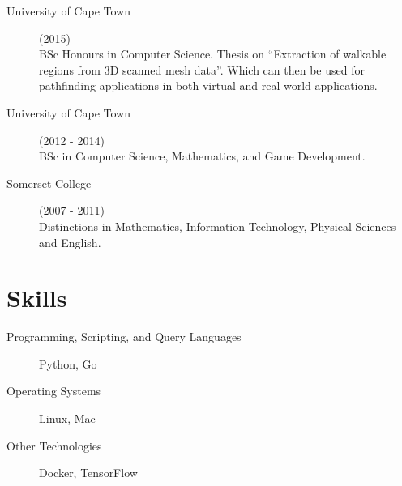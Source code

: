 \documentclass[margin,line,a4paper]{resume}
\begin{document}
\begin{resume}
\begin{description}
                \item[University of Cape Town] (2015) \\
                    BSc Honours in Computer Science. Thesis on ``Extraction of  walkable regions from 3D scanned mesh data''.
                    Which can then be used for pathfinding applications in both virtual and real world applications.

                \item[University of Cape Town] (2012 - 2014) \\
                    BSc in Computer Science, Mathematics, and Game Development.

                \item[Somerset College](2007 - 2011)\\
                    Distinctions in Mathematics, Information Technology, Physical Sciences and English.
            \end{description}

        \section{\mysidestyle Skills}
        	\begin{description}
	        	\item [Programming, Scripting, and Query Languages] Python, Go
	 			\item [Operating Systems] Linux, Mac
	 			\item [Other Technologies] Docker, TensorFlow
	 		\end{description}

    \end{resume}
\end{document}
